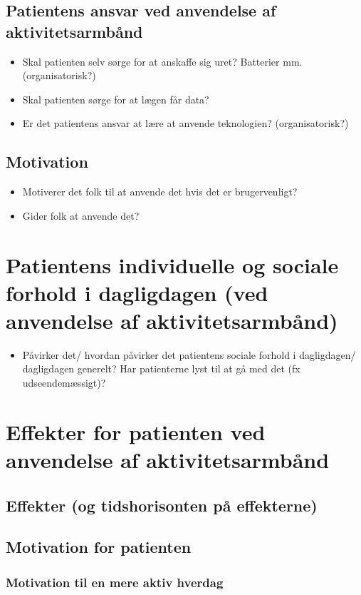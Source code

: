 \subsection{Patientens ansvar ved anvendelse af aktivitetsarmbånd}
\begin{itemize}
\item Skal patienten selv sørge for at anskaffe sig uret? Batterier mm. (organisatorisk?)
\item Skal patienten sørge for at lægen får data?
\item Er det patientens ansvar at lære at anvende teknologien? (organisatorisk?)
\end{itemize}

\subsection{Motivation}
\begin{itemize}
\item Motiverer det folk til at anvende det hvis det er brugervenligt?
\item Gider folk at anvende det?
\end{itemize}

\section{Patientens individuelle og sociale forhold i dagligdagen (ved anvendelse af aktivitetsarmbånd)}
\begin{itemize}
\item Påvirker det/ hvordan påvirker det patientens sociale forhold i dagligdagen/ dagligdagen generelt? Har patienterne lyst til at gå med det (fx udseendemæssigt)?
\end{itemize}

\section{Effekter for patienten ved anvendelse af aktivitetsarmbånd}
\subsection{Effekter (og tidshorisonten på effekterne)}
\subsection{Motivation for patienten}
\subsubsection{Motivation til en mere aktiv hverdag}

